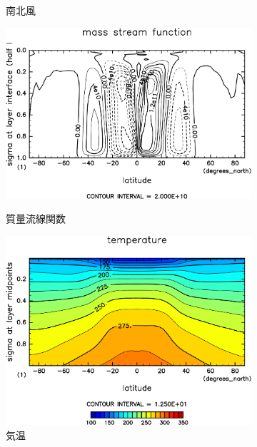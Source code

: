 \documentclass[body]{subfiles}
\begin{document}
\begin{figure}[t]
\begin{subfigure}{.4\textwidth}
		\caption{南北風\hmu*{[m/s]}}\label{S1366南北風}
	\end{subfigure}
	\begin{subfigure}{.4\textwidth}
		\centering
		\includegraphics[width=\textwidth,]{S1366/MSF,time=14600:14965-crop-rotate.pdf}
		\\\vspace{13pt}
		\caption{質量流線関数\hmu*{[kg/s]}}\label{S1366質量流線関数}
	\end{subfigure}
	\begin{subfigure}{.4\textwidth}
		\centering
		\includegraphics[width=\textwidth]{S1366/Temp,time=14600:14965-crop-rotate.pdf}
		\caption{気温\hmu*{[K]}}\label{S1366気温分布}
	\end{subfigure}
	\begin{subfigure}{.4\textwidth}

\end{subfigure}
\end{figure}
\end{document}
